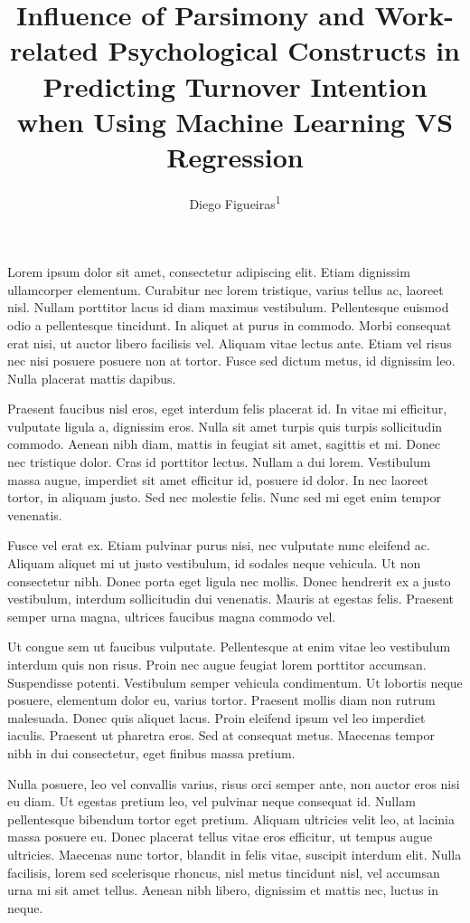 \documentclass[
  man]{apa7}
\title{Influence of Parsimony and Work-related Psychological Constructs in Predicting Turnover Intention when Using Machine Learning VS Regression}
\author{Diego Figueiras\textsuperscript{1}}
\date{}
\affiliation{\vspace{0.5cm}\textsuperscript{1} Montclai State University}
\begin{document}
\maketitle

Lorem ipsum dolor sit amet, consectetur adipiscing elit. Etiam dignissim ullamcorper elementum. Curabitur nec lorem tristique, varius tellus ac, laoreet nisl. Nullam porttitor lacus id diam maximus vestibulum. Pellentesque euismod odio a pellentesque tincidunt. In aliquet at purus in commodo. Morbi consequat erat nisi, ut auctor libero facilisis vel. Aliquam vitae lectus ante. Etiam vel risus nec nisi posuere posuere non at tortor. Fusce sed dictum metus, id dignissim leo. Nulla placerat mattis dapibus.

Praesent faucibus nisl eros, eget interdum felis placerat id. In vitae mi efficitur, vulputate ligula a, dignissim eros. Nulla sit amet turpis quis turpis sollicitudin commodo. Aenean nibh diam, mattis in feugiat sit amet, sagittis et mi. Donec nec tristique dolor. Cras id porttitor lectus. Nullam a dui lorem. Vestibulum massa augue, imperdiet sit amet efficitur id, posuere id dolor. In nec laoreet tortor, in aliquam justo. Sed nec molestie felis. Nunc sed mi eget enim tempor venenatis.

Fusce vel erat ex. Etiam pulvinar purus nisi, nec vulputate nunc eleifend ac. Aliquam aliquet mi ut justo vestibulum, id sodales neque vehicula. Ut non consectetur nibh. Donec porta eget ligula nec mollis. Donec hendrerit ex a justo vestibulum, interdum sollicitudin dui venenatis. Mauris at egestas felis. Praesent semper urna magna, ultrices faucibus magna commodo vel.

Ut congue sem ut faucibus vulputate. Pellentesque at enim vitae leo vestibulum interdum quis non risus. Proin nec augue feugiat lorem porttitor accumsan. Suspendisse potenti. Vestibulum semper vehicula condimentum. Ut lobortis neque posuere, elementum dolor eu, varius tortor. Praesent mollis diam non rutrum malesuada. Donec quis aliquet lacus. Proin eleifend ipsum vel leo imperdiet iaculis. Praesent ut pharetra eros. Sed at consequat metus. Maecenas tempor nibh in dui consectetur, eget finibus massa pretium.

Nulla posuere, leo vel convallis varius, risus orci semper ante, non auctor eros nisi eu diam. Ut egestas pretium leo, vel pulvinar neque consequat id. Nullam pellentesque bibendum tortor eget pretium. Aliquam ultricies velit leo, at lacinia massa posuere eu. Donec placerat tellus vitae eros efficitur, ut tempus augue ultricies. Maecenas nunc tortor, blandit in felis vitae, suscipit interdum elit. Nulla facilisis, lorem sed scelerisque rhoncus, nisl metus tincidunt nisl, vel accumsan urna mi sit amet tellus. Aenean nibh libero, dignissim et mattis nec, luctus in neque.
\end{document}
